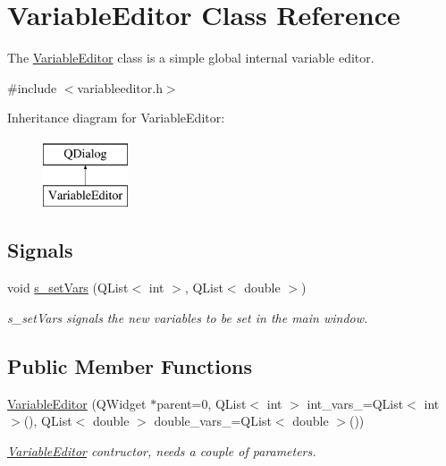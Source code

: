 \hypertarget{class_variable_editor}{\section{Variable\+Editor Class Reference}
\label{class_variable_editor}
}


The \hyperlink{class_variable_editor}{Variable\+Editor} class is a simple global internal variable editor.  




{\ttfamily \#include $<$variableeditor.\+h$>$}

Inheritance diagram for Variable\+Editor\+:\begin{figure}[H]
\begin{center}
\leavevmode
\includegraphics[height=2.000000cm]{class_variable_editor}
\end{center}
\end{figure}
\subsection*{Signals}
\begin{DoxyCompactItemize}
\item 
void \hyperlink{class_variable_editor_ad63cad542a41c66adf493666a531f1e3}{s\+\_\+set\+Vars} (Q\+List$<$ int $>$, Q\+List$<$ double $>$)
\begin{DoxyCompactList}\small\item\em s\+\_\+set\+Vars signals the new variables to be set in the main window. \end{DoxyCompactList}\end{DoxyCompactItemize}
\subsection*{Public Member Functions}
\begin{DoxyCompactItemize}
\item 
\hyperlink{class_variable_editor_a06fa8d1cdccf80a0a9fc9a706380f5ef}{Variable\+Editor} (Q\+Widget $\ast$parent=0, Q\+List$<$ int $>$ int\+\_\+vars\+\_\+=Q\+List$<$ int $>$(), Q\+List$<$ double $>$ double\+\_\+vars\+\_\+=Q\+List$<$ double $>$())
\begin{DoxyCompactList}\small\item\em \hyperlink{class_variable_editor}{Variable\+Editor} contructor, needs a couple of parameters. \end{DoxyCompactList}\end{DoxyCompactItemize}


